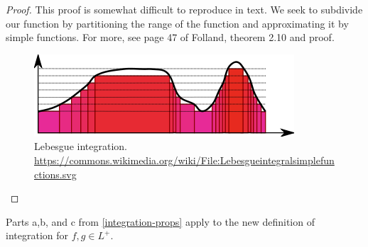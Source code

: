 \documentclass[11pt,leqno,oneside]{amsbook}
\numberwithin{thm}{section}
\begin{document}
\begin{proof}
  This proof is somewhat difficult to reproduce in text. We seek to
  subdivide our function by partitioning the range of the function and
  approximating it by simple
  functions. For more, see page 47 of Folland, theorem 2.10 and proof.\\
  \begin{figure}[h]
  \includegraphics[scale=0.5]{images/lebesgue-integral-simple-functions.png}
    \caption{Lebesgue integration.
      \url{https://commons.wikimedia.org/wiki/File:Lebesgueintegralsimplefunctions.svg}}
    \label{fig:lebesgue-integration}
  \end{figure}
\end{proof}
\begin{prop}
  Parts a,b, and c from \ref{integration-props} apply to the new
  definition of integration for $f,g \in L^+$.
\end{prop}
\end{document}
